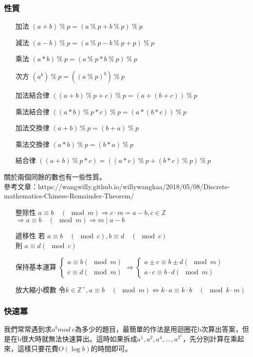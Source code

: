 \subsubsection{性質}
\begin{enumerate}
\item [加法] $(a+b)\ \%\ p= (a\ \%\ p +b\ \%\ p )\ \%\ p $
\item [減法] $(a-b)\ \%\ p= (a\ \%\ p -b\ \%\ p +p)\ \%\ p $
\item [乘法] $(a*b)\ \%\ p= (a\ \%\ p *b\ \%\ p )\ \%\ p $
\item [次方] $(a^b)\ \%\ p= ((a\ \%\ p )^b)\ \%\ p $
\item [加法結合律] $((a+b)\ \%\ p+c)\ \%\ p = (a+(b+c))\ \%\ p $
\item [乘法結合律] $((a*b)\ \%\ p*c)\ \%\ p = (a*(b*c))\ \%\ p $
\item [加法交換律] $(a+b)\ \%\ p=(b+a)\ \%\ p$
\item [乘法交換律] $(a*b)\ \%\ p=(b*a)\ \%\ p$
\item [結合律] $((a+b)\ \%\ p*c)= ((a*c)\ \%\ p +(b*c)\ \%\ p )\ \%\ p $
\end{enumerate}
關於兩個同餘的數也有一些性質。\\
參考文章：https://wangwilly.github.io/willywangkaa/2018/05/08/Discrete-mathematics-Chinese-Remainder-Theorem/
\begin{enumerate}
\item [整除性] $a\equiv b \quad (\mod m) \Rightarrow c \cdot m  = a - b , c \in \mathbb{Z}$\\ $\Rightarrow a \equiv b\quad ( \mod m ) \Rightarrow m \; | \; a-b$
\item [遞移性] 若 $a \equiv b \quad (\mod c) , b \equiv d \quad (\mod c)$\\ 則 $a \equiv d (\mod c)$
\item [保持基本運算] $\left \{ \begin{matrix} a \equiv b (\mod m)\\ c \equiv d (\mod m)\end{matrix}\right. \Rightarrow \left\{\begin{matrix}a \pm c \equiv b \pm d (\mod m)\\ a \cdot c \equiv b \cdot d (\mod m)\end{matrix}\right.$
\item [放大縮小模數] 令$k \in \mathbb{Z}^+ , a \equiv b \quad (\mod m) \Leftrightarrow k \cdot a \equiv k \cdot b \quad (\mod k \cdot m)$
\end{enumerate}
\subsubsection{快速冪}
我們常常遇到求$a^b mod\ c$為多少的題目，最簡單的作法是用迴圈花b次算出答案，但是在b很大時就無法快速算出。這時如果拆成$a^1,a^2,a^4,...,a^{2^x}$，先分別計算在乘起來，這樣只要花費$O(\log b)$的時間即可。

